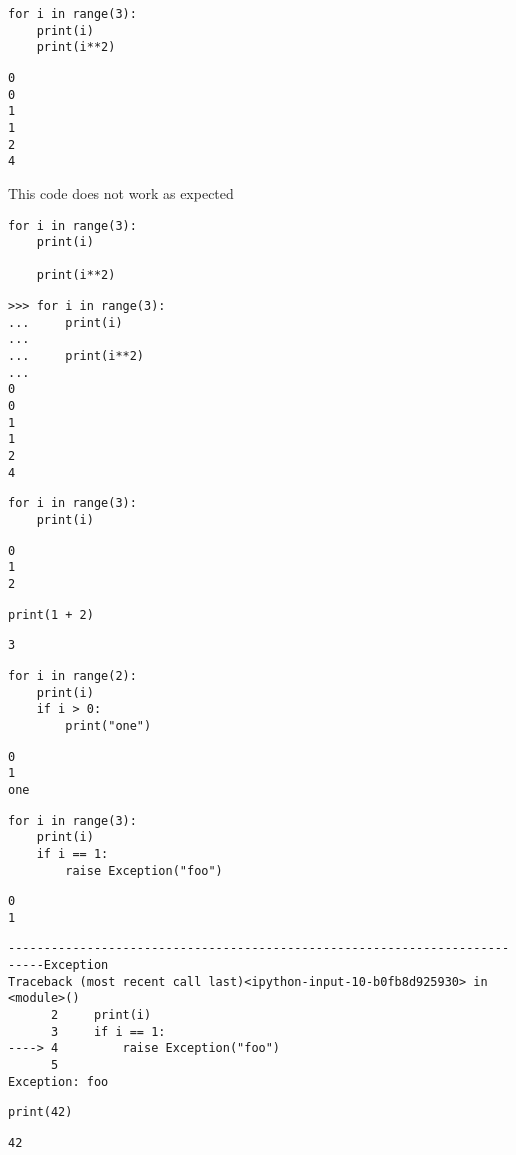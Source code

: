 
\begin{verbatim}
for i in range(3):
    print(i)
    print(i**2)
\end{verbatim}
\begin{verbatim}
0
0
1
1
2
4
\end{verbatim}

This code does not work as expected
\begin{verbatim}
for i in range(3):
    print(i)

    print(i**2)
\end{verbatim}


\begin{verbatim}
>>> for i in range(3):
...     print(i)
...
...     print(i**2)
...
0
0
1
1
2
4

\end{verbatim}


\begin{verbatim}
for i in range(3):
    print(i)
\end{verbatim}
\begin{verbatim}
0
1
2
\end{verbatim}

\begin{verbatim}
print(1 + 2)
\end{verbatim}
\begin{verbatim}
3
\end{verbatim}


\begin{verbatim}
for i in range(2):
    print(i)
    if i > 0:
        print("one")
\end{verbatim}
\begin{verbatim}
0
1
one
\end{verbatim}


\begin{verbatim}
for i in range(3):
    print(i)
    if i == 1:
        raise Exception("foo")
\end{verbatim}
\begin{verbatim}
0
1
\end{verbatim}
\begin{verbatim}
---------------------------------------------------------------------------Exception
Traceback (most recent call last)<ipython-input-10-b0fb8d925930> in
<module>()
      2     print(i)
      3     if i == 1:
----> 4         raise Exception("foo")
      5
Exception: foo
\end{verbatim}

\begin{verbatim}
print(42)
\end{verbatim}
\begin{verbatim}
42
\end{verbatim}

